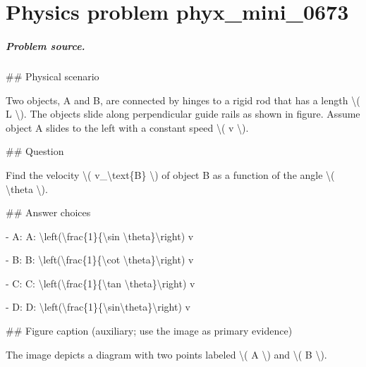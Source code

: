 
\chapter{Physics problem phyx\_mini\_0673}
\label{ch:PhyXMiniProblems_problem_phyx_mini_0673}

\paragraph{Problem source.}
\#\# Physical scenario

Two objects, A and B, are connected by hinges to a rigid rod that has a length \textbackslash{}( L \textbackslash{}). The objects slide along perpendicular guide rails as shown in figure. Assume object A slides to the left with a constant speed \textbackslash{}( v \textbackslash{}).

\#\# Question

Find the velocity \textbackslash{}( v\_\textbackslash{}text\{B\} \textbackslash{}) of object B as a function of the angle \textbackslash{}( \textbackslash{}theta \textbackslash{}).

\#\# Answer choices

- A: A: \textbackslash{}left(\textbackslash{}frac\{1\}\{\textbackslash{}sin \textbackslash{}theta\}\textbackslash{}right) v

- B: B: \textbackslash{}left(\textbackslash{}frac\{1\}\{\textbackslash{}cot \textbackslash{}theta\}\textbackslash{}right) v

- C: C: \textbackslash{}left(\textbackslash{}frac\{1\}\{\textbackslash{}tan \textbackslash{}theta\}\textbackslash{}right) v

- D: D: \textbackslash{}left(\textbackslash{}frac\{1\}\{\textbackslash{}sin\textbackslash{}theta\}\textbackslash{}right) v

\#\# Figure caption (auxiliary; use the image as primary evidence)

The image depicts a diagram with two points labeled \textbackslash{}( A \textbackslash{}) and \textbackslash{}( B \textbackslash{}). 

